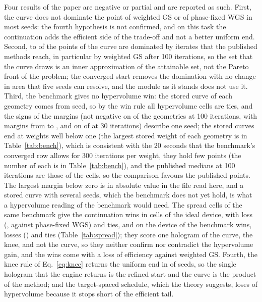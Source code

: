 Four results of the paper are negative or partial and are reported as such. First, the curve does not dominate the point of weighted GS or of phase-fixed WGS in most seeds: the fourth hypothesis is not confirmed, and on this task the continuation adds the efficient side of the trade-off and not a better uniform end. Second, \frontDomMin{} to \frontDomMax{} of the \nLambda{} points of the curve are dominated by iterates that the published methods reach, in particular by weighted GS after 100 iterations,
so the set that the curve draws is an inner approximation of the attainable set, not the Pareto front of the problem; the converged start removes the domination with no change in area that five seeds can resolve, and the module as it stands does not use it. Third, the benchmark gives no hypervolume win: the stored curve of each geometry comes from \benchSeedsFrontThirty{} seed, so by the win rule all \benchCells{} hypervolume cells are ties, and the signs of the margins (not negative on \benchPassHundred{} of the \benchNHundred{} geometries at 100 iterations, with margins from \benchWorstHundred{} to \benchBestHundred{}, and on \benchPassThirty{} of \benchNThirty{} at 30 iterations) describe one seed; the stored curves end at weights well below one (the largest stored weight of each geometry is in Table~\ref{tab:bench}), which is consistent with the 20 seconds that the benchmark's converged row allows for 300 iterations per weight, they hold few points (the number of each is in Table~\ref{tab:bench}), and the published medians at 100 iterations are those of the cells, so the comparison favours the published points. The largest margin below zero is \benchWorstAbsHundred{} in absolute value in the file read here, and a stored curve with several seeds, which the benchmark does not yet hold, is what a hypervolume reading of the benchmark would need. The spread cells of the same benchmark give the continuation \spreadWins{} wins in \spreadCells{} cells of the ideal device, with \spreadLosses{} loss (\spreadLossList{}, against phase-fixed WGS) and \spreadTies{} ties, and on the device of the benchmark \spreadDevWins{} wins, \spreadDevLosses{} losses (\spreadDevLossList{}) and \spreadDevTies{} ties (Table~\ref{tab:spread}); they score one hologram of the curve, the knee, and not the curve, so they neither confirm nor contradict the hypervolume gain, and the wins come with a loss of efficiency against weighted GS. Fourth, the knee rule of Eq.~\ref{eq:knee} returns the uniform end in \kneeZeroSeeds{} of \nSeeds{} seeds, so the single hologram that the engine returns is the
refined start and the curve is the product of the method; and the target-spaced schedule, which the theory suggests, loses \ablTargetDiff{} of hypervolume because it stops short of the efficient tail.

